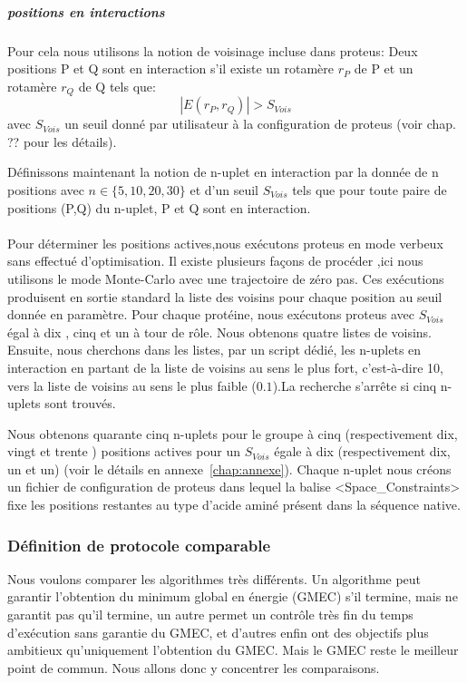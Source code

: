 \subparagraph{positions en interactions}
Pour cela nous utilisons la notion de voisinage incluse dans proteus: 
Deux positions P et Q sont en interaction s'il existe un rotamère $r_P$ de P et un rotamère $r_Q$ de Q tels que:
\begin{displaymath}
 | E(r_P,r_Q) | > S_{Vois}
\end{displaymath} 
avec $S_{Vois}$ un seuil donné par utilisateur à la configuration de proteus (voir chap. ?? pour les détails).

Définissons maintenant la notion de n-uplet en interaction par la donnée de n positions avec $n \in \{5,10,20,30\}$ et d'un seuil  $S_{Vois}$  tels que pour toute paire de positions (P,Q) du n-uplet, P et Q sont en interaction.
\paragraph{}
Pour déterminer les positions actives,nous exécutons proteus en mode verbeux sans effectué d'optimisation.
Il existe plusieurs façons de procéder ,ici nous utilisons le mode Monte-Carlo avec une trajectoire de zéro pas. Ces exécutions produisent en sortie standard la liste des voisins pour chaque position au seuil donnée en paramètre.
Pour chaque protéine, nous exécutons proteus avec  $S_{Vois}$ égal à dix , cinq et un à tour de rôle. Nous obtenons quatre listes de voisins. 
Ensuite, nous cherchons dans les listes, par un script dédié, les n-uplets en interaction en partant de la liste de voisins au sens le plus fort, c'est-à-dire 10, vers la liste de voisins au sens le plus faible ($0.1$).La recherche s'arrête si cinq n-uplets sont trouvés.

Nous obtenons quarante cinq n-uplets pour le groupe à cinq (respectivement dix, vingt et trente ) positions actives pour un $S_{Vois}$ égale à dix (respectivement dix, un et un) (voir le détails en annexe~\ref{chap:annexe}). Chaque n-uplet nous créons un fichier de configuration de proteus dans lequel la balise <Space\_Constraints> fixe les positions restantes au type d'acide aminé présent dans la séquence native. 


\subsubsection{Définition de protocole comparable}

Nous voulons comparer les algorithmes très différents. Un algorithme peut garantir l'obtention du minimum global en énergie (GMEC) s'il termine, mais ne garantit pas qu'il termine, un autre permet un contrôle très fin du temps d'exécution sans garantie du GMEC, et d'autres enfin ont des objectifs plus ambitieux  qu'uniquement l'obtention du GMEC.
Mais le GMEC reste le meilleur point de commun. Nous allons donc y concentrer les comparaisons.

